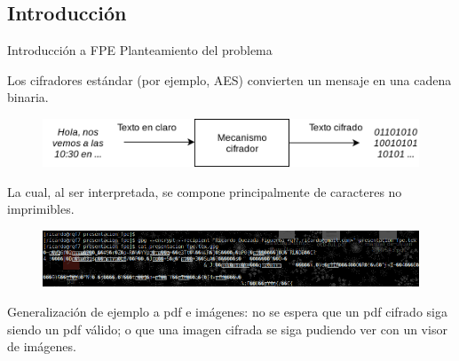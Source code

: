 %
%

\subsection{Introducción}

\begin{frame}{Introducción a FPE}
  {Planteamiento del problema}

  Los cifradores estándar (por ejemplo, AES) convierten un mensaje en una
  cadena binaria.

  \begin{figure}[H]
    \begin{center}
      \includegraphics[width=0.75\linewidth]{diagramas/cifrador_estandar.png}
    \end{center}
  \end{figure}


  La cual, al ser interpretada, se compone principalmente de caracteres no
  imprimibles.

  \begin{figure}[H]
    \begin{center}
      \includegraphics[width=1.0\linewidth]{diagramas/no_imprimibles.png}
    \end{center}
  \end{figure}

  {
    Generalización de ejemplo a pdf e imágenes: no se espera que un pdf cifrado
    siga siendo un pdf válido; o que una imagen cifrada se siga pudiendo
    ver con un visor de imágenes.
  }

\end{frame}

